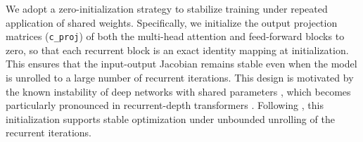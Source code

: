 \documentclass{article} %
\begin{document}

We adopt a zero-initialization strategy to stabilize training under repeated application of shared weights.
Specifically, we initialize the output projection matrices (\texttt{c\_proj}) of both the multi-head attention and feed-forward blocks to zero, so that each recurrent block is an exact identity mapping at initialization.
This ensures that the input-output Jacobian remains stable even when the model is unrolled to a large number of recurrent iterations.
This design is motivated by the known instability of deep networks with shared parameters \citep{agarwala2022deep}, which becomes particularly pronounced in recurrent-depth transformers \citep{saunshireasoning}.
Following \citet{zhang2019fixupinitializationresiduallearning}, this initialization supports stable optimization under unbounded unrolling of the recurrent iterations.
\end{document}
